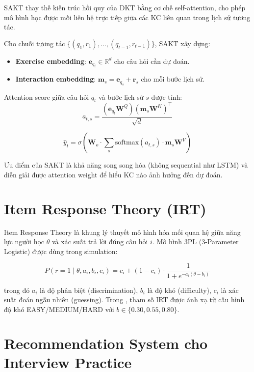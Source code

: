 SAKT \cite{pandey2019self} thay thế kiến trúc hồi quy của DKT bằng cơ chế self-attention, cho phép mô hình học được mối liên hệ trực tiếp giữa các KC liên quan trong lịch sử tương tác.

Cho chuỗi tương tác $\{(q_1, r_1), \ldots, (q_{t-1}, r_{t-1})\}$, SAKT xây dựng:
\begin{itemize}
  \item \textbf{Exercise embedding}: $\mathbf{e}_{q_t} \in \mathbb{R}^d$ cho câu hỏi cần dự đoán.
  \item \textbf{Interaction embedding}: $\mathbf{m}_s = \mathbf{e}_{q_s} + \mathbf{r}_s$ cho mỗi bước lịch sử.
\end{itemize}

Attention score giữa câu hỏi $q_t$ và bước lịch sử $s$ được tính:
\begin{equation}
  a_{t,s} = \frac{(\mathbf{e}_{q_t} \mathbf{W}^Q)(\mathbf{m}_s \mathbf{W}^K)^\top}{\sqrt{d}}
\end{equation}

\begin{equation}
  \hat{y}_t = \sigma\left(\mathbf{W}_o \cdot \sum_s \text{softmax}(a_{t,s}) \cdot \mathbf{m}_s \mathbf{W}^V\right)
\end{equation}

Ưu điểm của SAKT là khả năng song song hóa (không sequential như LSTM) và diễn giải được attention weight để hiểu KC nào ảnh hưởng đến dự đoán.

\section{Item Response Theory (IRT)}
\label{sec:irt}

Item Response Theory \cite{embretson2000item} là khung lý thuyết mô hình hóa mối quan hệ giữa năng lực người học $\theta$ và xác suất trả lời đúng câu hỏi $i$. Mô hình 3PL (3-Parameter Logistic) được dùng trong simulation:

\begin{equation}
  P(r = 1 \mid \theta, a_i, b_i, c_i) = c_i + (1 - c_i) \cdot \frac{1}{1 + e^{-a_i(\theta - b_i)}}
\end{equation}

trong đó $a_i$ là độ phân biệt (discrimination), $b_i$ là độ khó (difficulty), $c_i$ là xác suất đoán ngẫu nhiên (guessing). Trong \system{}, tham số IRT được ánh xạ từ cấu hình độ khó EASY/MEDIUM/HARD với $b \in \{0.30, 0.55, 0.80\}$.

\section{Recommendation System cho Interview Practice}
\label{sec:recsys}

